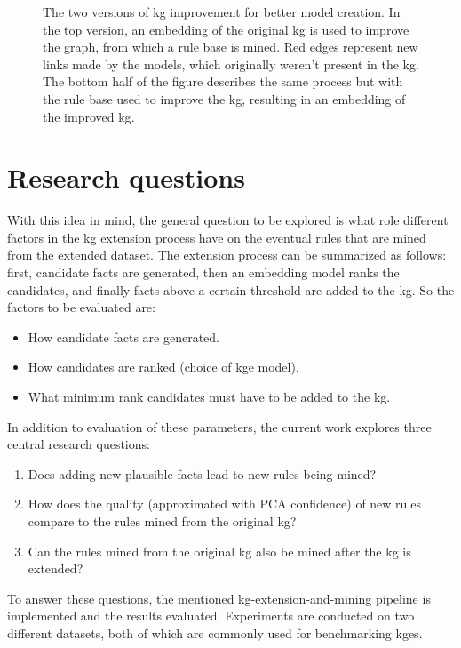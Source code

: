 \begin{figure}[htp]
    \centering
    
    \caption[Figure representing the process.]{The two versions of \gls{kg} improvement for better model creation. In the top version, an embedding of the original \gls{kg} is used to improve the graph, from which a rule base is mined. Red edges represent new links made by the models, which originally weren't present in the \gls{kg}. The bottom half of the figure describes the same process but with the rule base used to improve the \gls{kg}, resulting in an embedding of the improved \gls{kg}.}
    \label{rule_based_and_embedding}
\end{figure}

\section{Research questions}
With this idea in mind, the general question to be explored is what role different factors in the \gls{kg} extension process have on the eventual rules that are mined from the extended dataset. The extension process can be summarized as follows: first, candidate facts are generated, then an embedding model ranks the candidates, and finally facts above a certain threshold are added to the \gls{kg}. So the factors to be evaluated are:
\begin{itemize}
    \item How candidate facts are generated.
    \item How candidates are ranked (choice of \gls{kge} model).
    \item What minimum rank candidates must have to be added to the \gls{kg}.
\end{itemize}

In addition to evaluation of these parameters, the current work explores three central research questions:
\begin{enumerate}
    \item Does adding new plausible facts lead to new rules being mined?
    \item How does the quality (approximated with PCA confidence) of new rules compare to the rules mined from the original \gls{kg}?
    \item Can the rules mined from the original \gls{kg} also be mined after the \gls{kg} is extended?
\end{enumerate}

To answer these questions, the mentioned \gls{kg}-extension-and-mining pipeline is implemented and the results evaluated. Experiments are conducted on two different datasets, both of which are commonly used for benchmarking \glspl{kge}.

